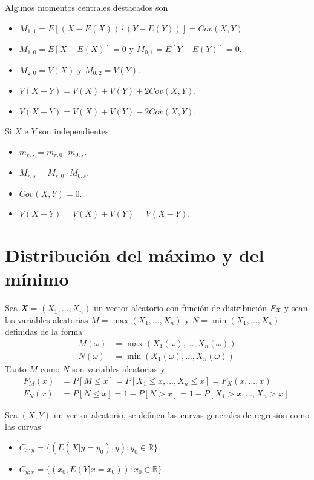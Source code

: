 Algunos momentos centrales destacados son
\begin{itemize}
    \item $M_{1,1} = E[(X - E(X)) \cdot (Y - E(Y))] = Cov(X,Y)$.
    \item $M_{1,0} = E[X - E(X)] = 0$ y $M_{0,1} = E[Y - E(Y)] = 0$.
    \item $M_{2,0} = V(X)$ y $M_{0,2} = V(Y)$.
\end{itemize}

\begin{obs}
\begin{itemize}
    \item $V(X+Y) = V(X) + V(Y) + 2Cov(X,Y)$.
    \item $V(X-Y) = V(X) + V(Y) - 2Cov(X,Y)$.
\end{itemize}
\end{obs}
Si $X$ e $Y$ son independientes
\begin{itemize}
    \item $m_{r,s} = m_{r,0} \cdot m_{0,s}$.
    \item $M_{r,s} = M_{r,0} \cdot M_{0,s}$.
    \item $Cov(X,Y) = 0$.
    \item $V(X + Y) = V(X) + V(Y) = V(X - Y)$.
\end{itemize}

\section{Distribución del máximo y del mínimo}

Sea \textit{\textbf{X}} = $(X_1,...,X_n)$ un vector aleatorio con función de distribución $F_{\textit{\textbf{X}}}$ y sean las variables aleatorias $M = \max(X_1,...,X_n)$ y $N = \min(X_1,...,X_n)$ definidas de la forma
\begin{align*}
    M(\omega) &= \max(X_1(\omega),...,X_n(\omega))\\
    N(\omega) &= \min(X_1(\omega),...,X_n(\omega))
\end{align*}
Tanto $M$ como $N$ son variables aleatorias y
\begin{align*}
    F_M(x) &= P[M \leq x] = P[X_1 \leq x,..., X_n \leq x] = F_X(x,...,x)\\
    F_N(x) &= P[N \leq x] = 1 - P[N > x] = 1 - P[X_1 > x,...,X_n > x].
\end{align*}

\begin{defi}
Sea $(X,Y)$ un vector aleatorio, se definen las curvas generales de regresión como las curvas
\begin{itemize}
    \item $C_{x;y} = \{ (E(X | y = y_0), y) : y_0 \in \mathbb{R} \}$.
    \item $C_{y;x} = \{ (x_0, E(Y | x = x_0)) : x_0 \in \mathbb{R} \}$.
\end{itemize}
\end{defi}
